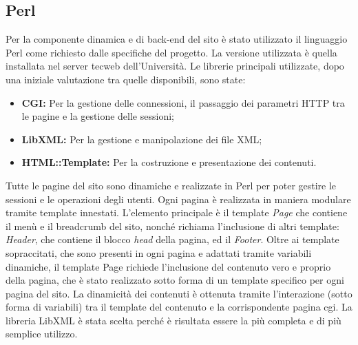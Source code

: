 \subsection{Perl}
Per la componente dinamica e di back-end del sito è stato utilizzato il linguaggio Perl come richiesto dalle specifiche del progetto. La versione utilizzata è quella installata nel server tecweb dell'Università. \newline
Le librerie principali utilizzate, dopo una iniziale valutazione tra quelle disponibili, sono state:
\begin{itemize}
	\item \textbf{CGI:} Per la gestione delle connessioni, il passaggio dei parametri HTTP tra le pagine e la gestione delle sessioni;
	\item \textbf{LibXML:} Per la gestione e manipolazione dei file XML;
	\item \textbf{HTML::Template:} Per la costruzione e presentazione dei contenuti. 
\end{itemize}
Tutte le pagine del sito sono dinamiche e realizzate in Perl per poter gestire le sessioni e le operazioni degli utenti.
Ogni pagina è realizzata in maniera modulare tramite template innestati. L'elemento principale è il template \textit{Page} che contiene il menù e il breadcrumb del sito, nonché richiama l'inclusione di altri template: \textit{Header}, che contiene il blocco \textit{head} della pagina, ed il \textit{Footer}. Oltre ai template sopraccitati, che sono presenti in ogni pagina e adattati tramite variabili dinamiche, il template Page richiede l'inclusione del contenuto vero e proprio della pagina, che è stato realizzato sotto forma di un template specifico per ogni pagina del sito. La dinamicità dei contenuti è ottenuta tramite l'interazione (sotto forma di variabili) tra il template del contenuto e la corrispondente pagina cgi.
La libreria LibXML è stata scelta perché è risultata essere la più completa e di più semplice utilizzo.

